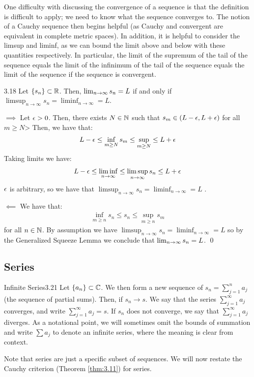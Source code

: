 \noindent One difficulty with discussing the convergence of a sequence is that the definition is difficult to apply; we need to know what the sequence converges to. The notion of a Cauchy sequence then begins helpful (as Cauchy and convergent are equivalent in complete metric spaces). In addition, it is helpful to consider the limsup and liminf, as we can bound the limit above and below with these quantities respectively. In particular, the limit of the supremum of the tail of the sequence equals the limit of the infinimum of the tail of the sequence equals the limit of the sequence if the sequence is convergent.

\setcounter{rudin}{17}
\begin{theorem}{}{3.18}
    Let $\set{s_n} \subset \mathbb{R}$. Then, $\lim_{n \rightarrow \infty} s_n = L$ if and only if $\limsup_{n \rightarrow \infty} s_n = \liminf_{n \rightarrow \infty} = L$.
\end{theorem}
\begin{nproof}
    $\boxed{\implies}$ Let $\epsilon > 0$. Then, there exists $N \in \mathbb{N}$ such that $s_m \in (L - \epsilon, L + \epsilon)$ for all $m \geq N$> Then, we have that:
    \begin{align*}
        L - \epsilon \leq \inf_{m \geq N} s_m \leq \sup_{m \geq N} \leq L + \epsilon
    \end{align*}
    Taking limits we have:
    \begin{align*}
        L - \epsilon \leq \liminf_{n \rightarrow \infty} \leq \limsup_{n \rightarrow \infty} s_n  \leq L + \epsilon
    \end{align*}
    $\epsilon$ is arbitrary, so we have that $\limsup_{n \rightarrow \infty} s_n = \liminf_{n \rightarrow \infty} = L$ .

    $\boxed{\impliedby}$ We have that:
    \begin{align*}
        \inf_{m \geq n} s_n \leq s_n \leq \sup_{m \geq n} s_m
    \end{align*}
    for all $n \in \mathbb{N}$. By assumption we have $\limsup_{n \rightarrow \infty} s_n = \liminf_{n \rightarrow \infty} = L$ so by the Generalized Squeeze Lemma we conclude that $\lim_{n \rightarrow \infty} s_n = L$. \qed
\end{nproof}
\subsection{Series}

\setcounter{rudin}{20}
\begin{definition}{Infinite Series}{3.21}
    Let $\set{a_n} \subset \mathbb{C}$. We then form a new sequence of $s_n = \sum_{j=1}^n a_j$ (the sequence of partial sums). Then, if $s_n \rightarrow s$. We say that the series $\sum_{j = 1}^\infty a_j$ converges, and write $\sum_{j = 1}^\infty a_j = s$. If $s_n$ does not converge, we say that $\sum_{j=1}^\infty a_j$ diverges. As a notational point, we will sometimes omit the bounds of summation and write $\sum a_j$ to denote an infinite series, where the meaning is clear from context.
\end{definition}
\noindent Note that series are just a specific subset of sequences. We will now restate the Cauchy criterion (Theorem \ref{thm:3.11}) for series.

